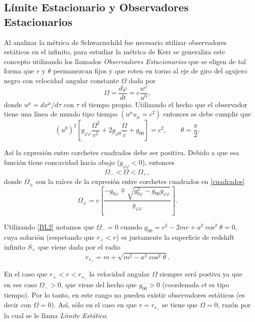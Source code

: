 \subsection{L\'imite Estacionario y Observadores Estacionarios}

Al analizar la m\'etrica de Schwarzschild fue necesario utilizar observadores est\'aticos en el infinito, para estudiar la m\'etrica de Kerr se generaliza este concepto utilizando los llamados \textit{Observadores Estacionarios} que se eligen de tal forma que $r$ y $\theta$ permanezcan fijos
y que roten en torno al eje de giro del agujero negro con velocidad angular constante $\Omega$ dada por
\begin{equation}
\Omega=\frac{d\varphi}{dt}=c\frac{u^{\varphi}}{u^{0}},
\end{equation}
donde $u^{\mu}=dx^{\mu}/d\tau$ con $\tau$ el tiempo propio. Utilizando el hecho que el observador tiene una l\'inea de mundo tipo tiempo $(u^{\mu}u_{\mu}=c^2)$ entonces se debe cumplir que
\begin{equation}\label{cuadrados}
\left(u^{0}\right)^2\left[g_{\varphi \varphi}\frac{\Omega^2}{c^2}+2g_{\varphi 0}\frac{\Omega}{c} +g_{00}\right]=c^2, \qquad \theta=\frac{\pi}{2}.
\end{equation}

As\'i la expresi\'on entre corchetes cuadrados debe ser positiva. Debido  a que esa funci\'on tiene concavidad hacia abajo ($g_{\varphi \varphi}<0$), entonces 
\begin{equation}
\Omega_{-}<\Omega <\Omega_{+},
\end{equation}
donde $\Omega_{\pm}$ son la ra\'ices de la expresi\'on entre corchetes cuadrados en \eqref{cuadrados}
\begin{equation}\label{roots}
\Omega_{\pm}= c\left[ \frac{-g_{0\varphi}\mp\sqrt{g_{0\varphi}^2-g_{00}g_{\varphi \varphi}}}{g_{\varphi \varphi}} \right].
\end{equation}

Utilizando \eqref{BL2} notamos que $\Omega_{-}=0$ cuando $g_{00}=r^2-2mr+a^2\cos^2 \theta=0$, cuya soluci\'on (respetando que $r_+<r$) es justamente la superficie de redshift infinito $S_{+}$ que viene dada por el radio
\begin{equation}
r_{s_+}=m+\sqrt{m^2-a^2\cos^2\theta}.
\end{equation}

En el caso que $r_+<r<r_{s_+}$ la velocidad angular $\Omega$ siempre ser\'a postiva ya que en ese caso $\Omega_{-}>0$, que viene del hecho que $g_{00}>0$ (coordenada $ct$ es tipo tiempo). Por lo tanto, en este rango no pueden existir observadores est\'aticos (es decir con $\Omega=0$). As\'i, s\'olo en el caso en que $r=r_{s_+}$ se tiene que $\Omega=0$, raz\'on por la cual se le llama \textit{L\'imite Est\'atico}.\\

